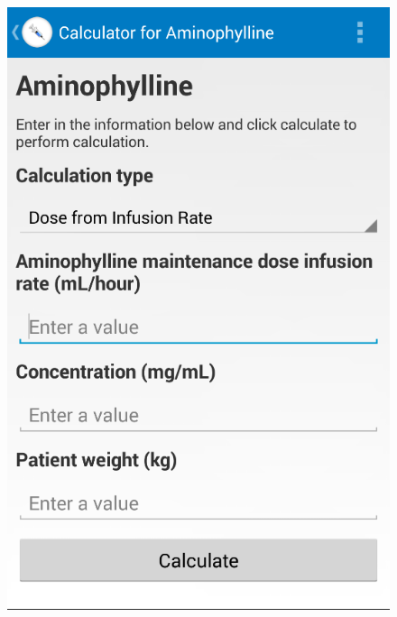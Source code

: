 \begin{figure}[H]
\begin{minipage}{.5\textwidth}
  \includegraphics[width=.8\linewidth]{Images/screenshots/API18/calc.png}
\end{minipage}
\end{figure}

